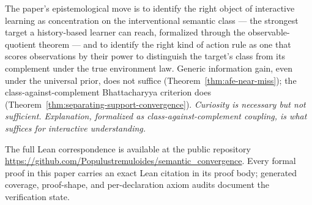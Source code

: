 \documentclass[11pt]{article}
\theoremstyle{definition}
\theoremstyle{remark}
\theoremstyle{plain}
\theoremstyle{definition}
\begin{document}
The paper's epistemological move is to identify the right object of interactive learning as concentration on the interventional semantic class --- the strongest target a history-based learner can reach, formalized through the observable-quotient theorem --- and to identify the right kind of action rule as one that scores observations by their power to distinguish the target's class from its complement under the true environment law. Generic information gain, even under the universal prior, does not suffice (Theorem~\ref{thm:afe-near-miss}); the class-against-complement Bhattacharyya criterion does (Theorem~\ref{thm:separating-support-convergence}). \emph{Curiosity is necessary but not sufficient. Explanation, formalized as class-against-complement coupling, is what suffices for interactive understanding.}

The full Lean correspondence is available at the public repository \url{https://github.com/Populustremuloides/semantic_convergence}. Every formal proof in this paper carries an exact Lean citation in its proof body; generated coverage, proof-shape, and per-declaration axiom audits document the verification state.



\end{document}
